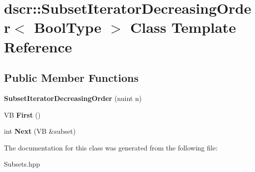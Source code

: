 \hypertarget{classdscr_1_1_subset_iterator_decreasing_order}{\section{dscr\-:\-:Subset\-Iterator\-Decreasing\-Order$<$ Bool\-Type $>$ Class Template Reference}
\label{classdscr_1_1_subset_iterator_decreasing_order}
}
\subsection*{Public Member Functions}
\begin{DoxyCompactItemize}
\item 
\hypertarget{classdscr_1_1_subset_iterator_decreasing_order_ac0b962607e3576ab9a275841eeb64a86}{{\bfseries Subset\-Iterator\-Decreasing\-Order} (nuint n)}\label{classdscr_1_1_subset_iterator_decreasing_order_ac0b962607e3576ab9a275841eeb64a86}

\item 
\hypertarget{classdscr_1_1_subset_iterator_decreasing_order_a85c8f7dbc312b1a1728ae3a971eba0f8}{V\-B {\bfseries First} ()}\label{classdscr_1_1_subset_iterator_decreasing_order_a85c8f7dbc312b1a1728ae3a971eba0f8}

\item 
\hypertarget{classdscr_1_1_subset_iterator_decreasing_order_a642476080c21bcdbcfedbb1ccf9af75e}{int {\bfseries Next} (V\-B \&subset)}\label{classdscr_1_1_subset_iterator_decreasing_order_a642476080c21bcdbcfedbb1ccf9af75e}

\end{DoxyCompactItemize}


The documentation for this class was generated from the following file\-:\begin{DoxyCompactItemize}
\item 
Subsets.\-hpp\end{DoxyCompactItemize}
